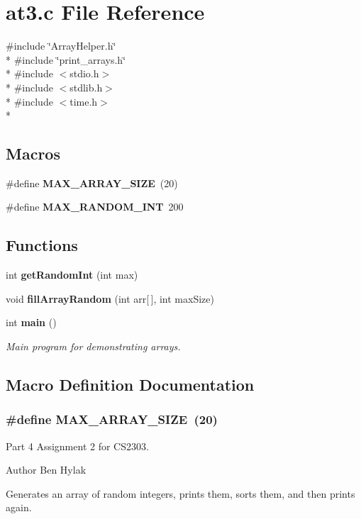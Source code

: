 \section{at3.\+c File Reference}
\label{at3_8c}
{\ttfamily \#include \char`\"{}Array\+Helper.\+h\char`\"{}}\\*
{\ttfamily \#include \char`\"{}print\+\_\+arrays.\+h\char`\"{}}\\*
{\ttfamily \#include $<$stdio.\+h$>$}\\*
{\ttfamily \#include $<$stdlib.\+h$>$}\\*
{\ttfamily \#include $<$time.\+h$>$}\\*
\subsection*{Macros}
\begin{DoxyCompactItemize}
\item 
\#define {\bf M\+A\+X\+\_\+\+A\+R\+R\+A\+Y\+\_\+\+S\+I\+ZE}~(20)
\item 
\#define {\bf M\+A\+X\+\_\+\+R\+A\+N\+D\+O\+M\+\_\+\+I\+NT}~200
\end{DoxyCompactItemize}
\subsection*{Functions}
\begin{DoxyCompactItemize}
\item 
int {\bf get\+Random\+Int} (int max)
\item 
void {\bf fill\+Array\+Random} (int arr[$\,$], int max\+Size)
\item 
int {\bf main} ()
\begin{DoxyCompactList}\small\item\em Main program for demonstrating arrays. \end{DoxyCompactList}\end{DoxyCompactItemize}


\subsection{Macro Definition Documentation}
\subsubsection[{M\+A\+X\+\_\+\+A\+R\+R\+A\+Y\+\_\+\+S\+I\+ZE}]{\setlength{\rightskip}{0pt plus 5cm}\#define M\+A\+X\+\_\+\+A\+R\+R\+A\+Y\+\_\+\+S\+I\+ZE~(20)}\label{at3_8c_a40af4217190d59d7145e58a278f9f87d}
Part 4 Assignment 2 for C\+S2303. \begin{DoxyAuthor}{Author}
Ben Hylak
\end{DoxyAuthor}
Generates an array of random integers, prints them, sorts them, and then prints again. 

